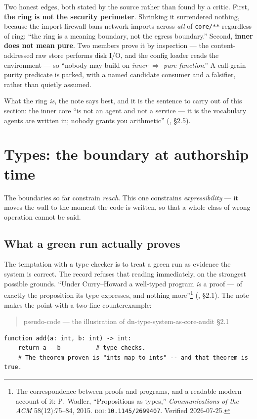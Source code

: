 Two honest edges, both stated by the source rather than found by a critic. First,
\textbf{the ring is not the security perimeter}. Shrinking it surrendered nothing,
because the import firewall bans network imports across \emph{all} of
\texttt{core/**} regardless of ring: ``the ring is a meaning boundary, not the
egress boundary.'' Second, \textbf{inner does not mean pure}. Two members prove it
by inspection --- the content-addressed raw store performs disk I/O, and the config
loader reads the environment --- so ``nobody may build on \emph{inner $\Rightarrow$
pure function}.'' A call-grain purity predicate is parked, with a named candidate
consumer and a falsifier, rather than quietly assumed.

What the ring \emph{is}, the note says best, and it is the sentence to carry out of
this section: the inner core ``is not an agent and not a service --- it is the
vocabulary agents are written in; nobody grants you arithmetic''
(, \S 2.5).

\section{Types: the boundary at authorship time}
\label{sec:types}

The boundaries so far constrain \emph{reach}. This one constrains
\emph{expressibility} --- it moves the wall to the moment the code is written, so
that a whole class of wrong operation cannot be said.

\subsection*{What a green run actually proves}

The temptation with a type checker is to treat a green run as evidence the system
is correct. The record refuses that reading immediately, on the strongest possible
grounds. ``Under Curry--Howard a well-typed program \emph{is} a proof --- of
exactly the proposition its type expresses, and nothing
more''\footnote{The correspondence between proofs and programs, and a readable
modern account of it: P.~Wadler, ``Propositions as types,'' \emph{Communications of
the ACM} 58(12):75--84, 2015. \textsc{doi}:\,\texttt{10.1145/2699407}. Verified
2026-07-25.} (, \S 2.1). The note makes the
point with a two-line counterexample:

\begin{quote}\small\ttfamily
pseudo-code --- the illustration of dn-type-system-as-core-audit \S 2.1
\end{quote}
{\small\begin{verbatim}
function add(a: int, b: int) -> int:
    return a - b          # type-checks.
    # The theorem proven is "ints map to ints" -- and that theorem is true.
\end{verbatim}}

